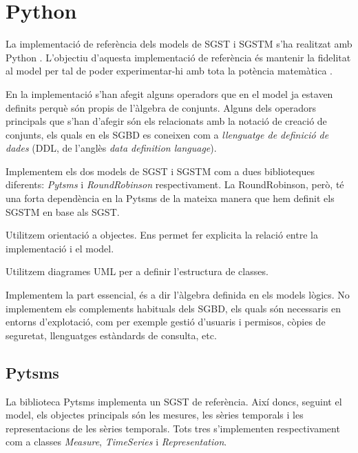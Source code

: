 

\chapter{Python}


La implementació de referència dels models de SGST i SGSTM s'ha
realitzat amb Python . L'objectiu d'aquesta
implementació de referència és mantenir la fidelitat al model per tal
de poder experimentar-hi amb tota la potència matemàtica .

En la implementació s'han afegit alguns operadors que en el model ja
estaven definits perquè són propis de l'àlgebra de conjunts. Alguns
dels operadors principals que s'han d'afegir són els relacionats amb
la notació de creació de conjunts, els quals en els SGBD es coneixen
com a \emph{llenguatge de definició de dades} (DDL, de l'anglès
\emph{data definition language}). 


Implementem els dos models de SGST i SGSTM com a dues biblioteques
diferents: \emph{Pytsms} i \emph{RoundRobinson} respectivament. La
RoundRobinson, però, té una forta dependència en la
Pytsms de la mateixa manera que hem definit els SGSTM en base
als SGST.


Utilitzem orientació a objectes. Ens permet fer explicita la relació
entre la implementació i el model. 

Utilitzem diagrames UML per a definir l'estructura de classes. 


Implementem la part essencial, és a dir l'àlgebra definida en els
models lògics. No implementem els complements habituals dels SGBD, els
quals són necessaris en entorns d'explotació, com per exemple gestió
d'usuaris i permisos, còpies de seguretat, llenguatges estàndards de
consulta, etc.




\section{Pytsms}

La biblioteca Pytsms implementa un SGST de referència. Així
doncs, seguint el model, els objectes principals són les mesures, les
sèries temporals i les representacions de les sèries temporals. Tots
tres s'implementen respectivament com a classes \emph{Measure},
\emph{TimeSeries} i \emph{Representation}.


